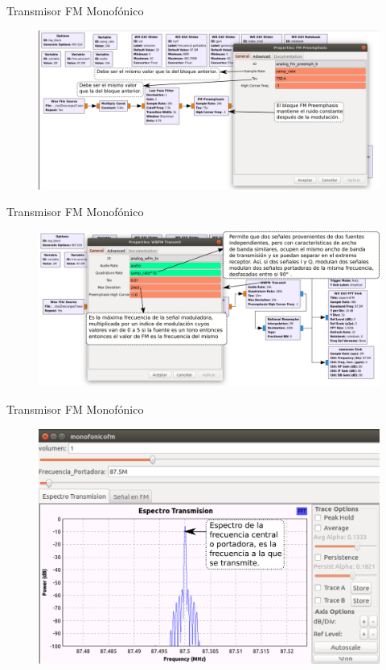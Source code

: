 \begin{frame}{Transmisor FM Monofónico}

\begin{figure}[H]
\centering
\vspace{-3mm}
\includegraphics[width=\textwidth]{parte3/lab11/pdf/lab11_4.pdf}
\end{figure}

\end{frame}

\begin{frame}{Transmisor FM Monofónico}

\begin{figure}[H]
\centering
\vspace{-3mm}
\includegraphics[width=\textwidth]{parte3/lab11/pdf/lab11_5.pdf}
\end{figure}

\end{frame}

\begin{frame}{Transmisor FM Monofónico}

\begin{figure}[H]
\centering
\vspace{-3mm}
\includegraphics[width=\textwidth]{parte3/lab11/pdf/lab11_6.pdf}
\end{figure}

\end{frame}
